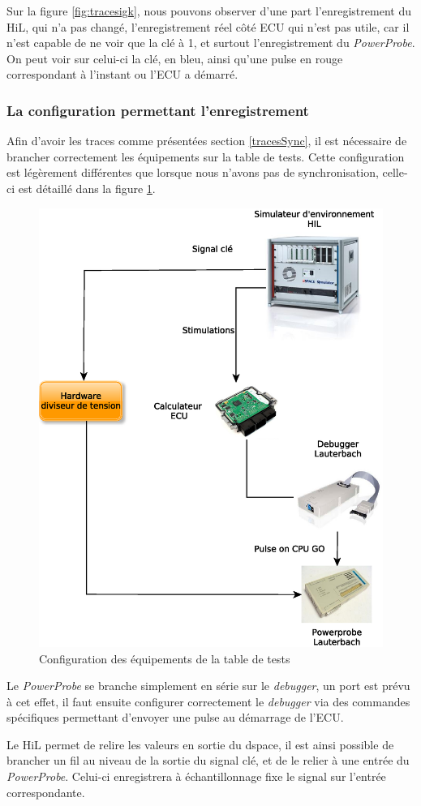 Sur la figure \ref{fig:tracesigk}, nous pouvons observer d'une part l'enregistrement du HiL, qui n'a pas changé, l'enregistrement réel côté ECU qui n'est pas utile, car il n'est capable de ne voir que la clé à 1, et surtout l'enregistrement du \textit{PowerProbe}. On peut voir sur celui-ci la clé, en bleu, ainsi qu'une pulse en rouge correspondant à l'instant ou l'ECU a démarré. 

\subsubsection{La configuration permettant l'enregistrement}
Afin d'avoir les traces comme présentées section  \ref{tracesSync}, il est nécessaire de brancher correctement les équipements sur la table de tests. Cette configuration est légèrement différentes que lorsque nous n'avons pas de synchronisation, celle-ci est détaillé dans la figure \ref{fig:tracesSync}.

\begin{figure}[H]
\centering
\includegraphics[width=0.42\linewidth]{contents/images/tracesSync}
\caption{Configuration des équipements de la table de tests}
\label{fig:tracesSync}
\end{figure}


Le \textit{PowerProbe} se branche simplement en série sur le \textit{debugger}, un port est prévu à cet effet, il faut ensuite configurer correctement le \textit{debugger} via des commandes spécifiques permettant d'envoyer une pulse au démarrage de l'ECU. 

Le HiL permet de relire les valeurs en sortie du dspace, il est ainsi possible de brancher un fil au niveau de la sortie du signal clé, et de le relier à une entrée du \textit{PowerProbe}. Celui-ci enregistrera à échantillonnage fixe le signal sur l'entrée correspondante. 


